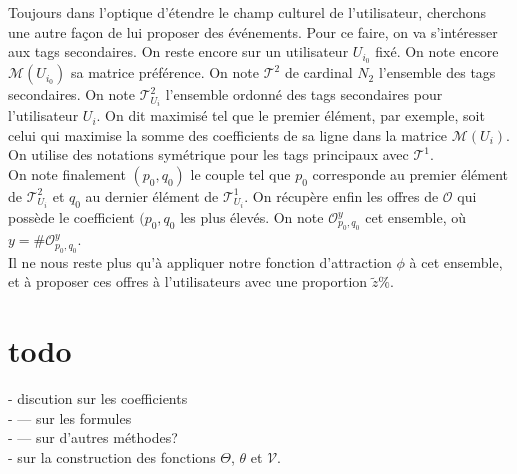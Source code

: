 \documentclass[11pt, oneside]{article}
\begin{document}
Toujours dans l'optique d'étendre le champ culturel de l'utilisateur, cherchons une autre façon de lui proposer des événements. Pour ce faire, on va s'intéresser aux tags secondaires. On reste encore sur un utilisateur $U_{i_0}$ fixé. On note encore $\mathcal{M} (U_{i_0})$ sa matrice préférence. On note $\mathcal{T}^2$ de cardinal $N_2$ l'ensemble des tags secondaires. On note $\mathcal{T}^2_{U_i}$ l'ensemble ordonné des tags secondaires pour l'utilisateur $U_i$. On dit maximisé tel que le premier élément, par exemple, soit celui qui maximise la somme des coefficients de sa ligne dans la matrice $\mathcal{M} (U_{i})$. On utilise des notations symétrique pour les tags principaux avec $\mathcal{T}^1$. \\
On note finalement $(p_0,q_0)$ le couple tel que $p_0$ corresponde au premier élément de $\mathcal{T}^2_{U_i}$ et $q_0$ au dernier élément de $\mathcal{T}^1_{U_i}$. On récupère enfin les offres de $\mathcal{O}$ qui possède le coefficient $(p_0,q_0$ les plus élevés. On note $\mathcal{O}_{p_0,q_0}^y$ cet ensemble, où $y = \# \mathcal{O}_{p_0,q_0}^y$. \\

Il ne nous reste plus qu'à appliquer notre fonction d'attraction $\phi$ à cet ensemble, et à proposer ces offres à l'utilisateurs avec une proportion $\tilde{z} \%$.

\section{todo}

- discution sur les coefficients \\
- --- sur les formules \\
- --- sur d'autres méthodes? \\
- sur la construction des fonctions $\Theta$, $\theta$ et $\mathcal{V}$. \\
\end{document}
